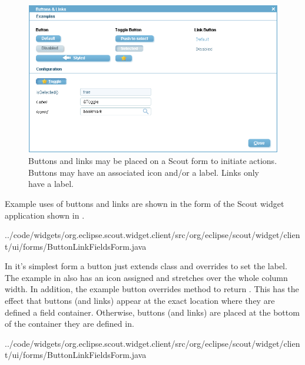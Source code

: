 \documentclass[a4paper,10pt,twoside]{book}
\begin{document}
\begin{figure}
\includegraphics[width=15cm]{buttonlink.png}
\caption{Buttons and links may be placed on a Scout form to initiate actions.
Buttons may have an associated icon and/or a label.
Links only have a label.}
\end{figure}

Example uses of buttons and links are shown in the form  of the Scout widget application shown in . 


{../code/widgets/org.eclipse.scout.widget.client/src/org/eclipse/scout/widget/client/ui/forms/ButtonLinkFieldsForm.java}

In it's simplest form a button just extends class  and overrides  to set the label. 
The example in  also has an icon assigned and stretches over the whole column width. 
In addition, the example button overrides method  to return . 
This has the effect that buttons (and links) appear at the exact location where they are defined a field container. 
Otherwise, buttons (and links) are placed at the bottom of the container they are defined in. 


{../code/widgets/org.eclipse.scout.widget.client/src/org/eclipse/scout/widget/client/ui/forms/ButtonLinkFieldsForm.java}
\end{document}
